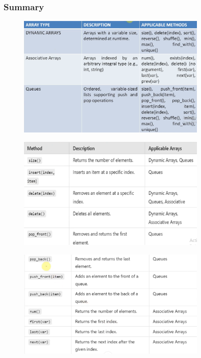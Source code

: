 \documentclass[12pt, a4paper]{article}
\begin{document}
\subsubsection{Summary}

\begin{figure}[H]
    \centering
    \includegraphics[width=0.8\textwidth]{DataTypes_sum1.png}
\end{figure}
\vspace{-2em}
\begin{figure}[H]
    \centering
    \includegraphics[width=0.8\textwidth]{DataTypes_sum2.png}
\end{figure}
\vspace{-2em}
\begin{figure}[H]
    \centering
    \includegraphics[width=0.8\textwidth]{DataTypes_sum3.png}
\end{figure}
\end{document}
